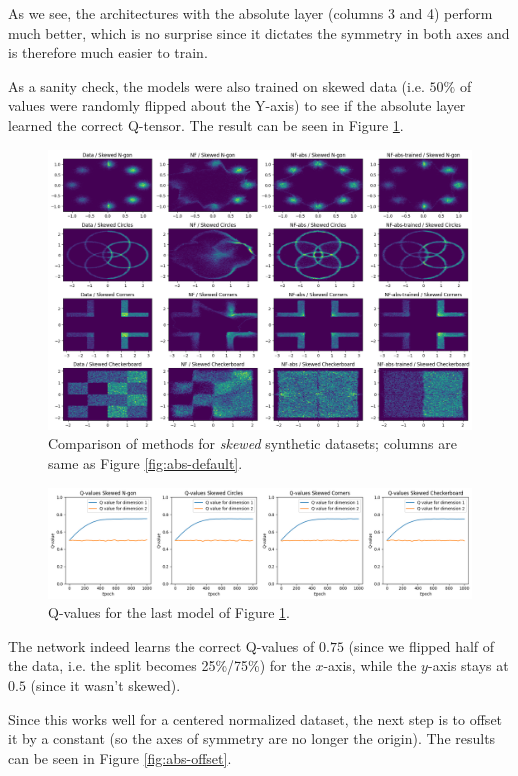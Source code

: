 As we see, the architectures with the absolute layer (columns 3 and 4) perform much better, which is no surprise since it dictates the symmetry in both axes and is therefore much easier to train.

As a sanity check, the models were also trained on skewed data (i.e. $50\%$ of values were randomly flipped about the Y-axis) to see if the absolute layer learned the correct Q-tensor. The result can be seen in Figure \ref{fig:abs-skewed}.

\begin{figure}[H]
    \centering
    \includegraphics[width=.85\linewidth]{images/synthetic/abs-skewed.png}
    \caption{Comparison of methods for \textit{skewed} synthetic datasets; columns are same as Figure \ref{fig:abs-default}.}
    \label{fig:abs-skewed}
\end{figure}

\begin{figure}[H]
    \centering
    \includegraphics[width=.85\linewidth]{images/synthetic/skewed-q.png}
    \caption{Q-values for the last model of Figure \ref{fig:abs-skewed}.}
    \label{fig:skewed-q}
\end{figure}

The network indeed learns the correct Q-values of $0.75$ (since we flipped half of the data, i.e. the split becomes 25\%/75\%) for the $x$-axis, while the $y$-axis stays at $0.5$ (since it wasn't skewed).

Since this works well for a centered normalized dataset, the next step is to offset it by a constant (so the axes of symmetry are no longer the origin).  
The results can be seen in Figure \ref{fig:abs-offset}.

